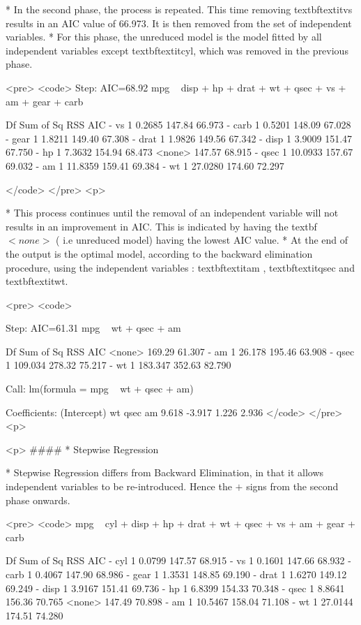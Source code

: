 *  In the second phase, the process is repeated. This time removing textbf{textit{vs}} results in an AIC value of 66.973. It is then removed from the set of independent variables. 
*  For this phase, the unreduced model is the model fitted by all independent variables except textbf{textit{cyl}}, which was removed in the previous phase.
	
<pre>
<code>
Step:  AIC=68.92
mpg ~ disp + hp + drat + wt + qsec + vs + am + gear + carb

       Df Sum of Sq    RSS    AIC
- vs    1    0.2685 147.84 66.973
- carb  1    0.5201 148.09 67.028
- gear  1    1.8211 149.40 67.308
- drat  1    1.9826 149.56 67.342
- disp  1    3.9009 151.47 67.750
- hp    1    7.3632 154.94 68.473
<none>              147.57 68.915
- qsec  1   10.0933 157.67 69.032
- am    1   11.8359 159.41 69.384
- wt    1   27.0280 174.60 72.297

</code>
</pre>
<p>

*  This process continues until the removal of an independent variable will not results in an improvement in AIC. This is indicated by having the textbf{$<none>$} ( i.e unreduced model) having the lowest AIC value.
	          * At the end of the output is the optimal model, according to the backward elimination procedure, using the independent variables : textbf{textit{am}} , textbf{textit{qsec}} and textbf{textit{wt}}.


<pre>
<code>


Step:  AIC=61.31
mpg ~ wt + qsec + am

       Df Sum of Sq    RSS    AIC
<none>              169.29 61.307
- am    1    26.178 195.46 63.908
- qsec  1   109.034 278.32 75.217
- wt    1   183.347 352.63 82.790

Call:
lm(formula = mpg ~ wt + qsec + am)

Coefficients:
(Intercept)           wt         qsec           am
      9.618       -3.917        1.226        2.936
</code>
</pre>
<p>

<p>
####        * {Stepwise Regression}

*  Stepwise Regression differs from Backward Elimination, in that it allows independent variables to be re-introduced. Hence the $+$ signs from the second phase onwards.


<pre>
<code>
mpg ~ cyl + disp + hp + drat + wt + qsec + vs + am + gear + carb

       Df Sum of Sq    RSS    AIC
- cyl   1    0.0799 147.57 68.915
- vs    1    0.1601 147.66 68.932
- carb  1    0.4067 147.90 68.986
- gear  1    1.3531 148.85 69.190
- drat  1    1.6270 149.12 69.249
- disp  1    3.9167 151.41 69.736
- hp    1    6.8399 154.33 70.348
- qsec  1    8.8641 156.36 70.765
<none>              147.49 70.898
- am    1   10.5467 158.04 71.108
- wt    1   27.0144 174.51 74.280

